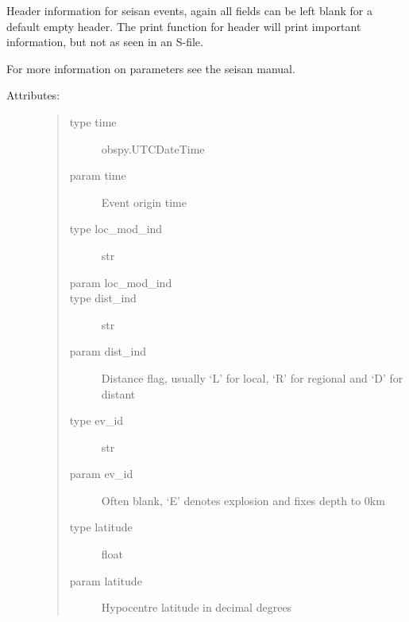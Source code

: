 \documentclass[a4paper,10pt,english]{sphinxmanual}
\begin{document}
\begin{fulllineitems}
\label{submodules/utils.Sfile_util:Sfile_util.EVENTINFO}
Header information for seisan events, again all fields can be left blank for    a default empty header.  The print function for header will print important    information, but not as seen in an S-file.

For more information on parameters see the seisan manual.
\begin{description}
\item[{Attributes:}] \leavevmode\begin{quote}\begin{description}
\item[{type time}] \leavevmode
obspy.UTCDateTime

\item[{param time}] \leavevmode
Event origin time

\item[{type loc\_mod\_ind}] \leavevmode
str

\item[{param loc\_mod\_ind}] \leavevmode
\item[{type dist\_ind}] \leavevmode
str

\item[{param dist\_ind}] \leavevmode
Distance flag, usually `L' for local, `R' for regional            and `D' for distant

\item[{type ev\_id}] \leavevmode
str

\item[{param ev\_id}] \leavevmode
Often blank, `E' denotes explosion and fixes depth to 0km

\item[{type latitude}] \leavevmode
float

\item[{param latitude}] \leavevmode
Hypocentre latitude in decimal degrees


\end{description}
\end{quote}
\end{description}
\end{fulllineitems}
\end{document}
